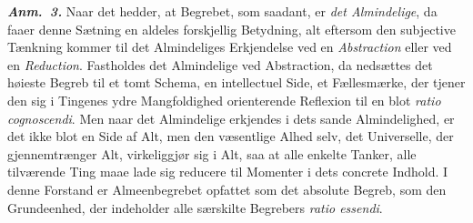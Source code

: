 \documentclass[12pt]{book}
\newcommand{\anm}[1]{\emph{\textbf{Anm.~#1.}}}
\begin{document}
\anm{3} Naar det hedder, at Begrebet, som saadant, er \emph{det Almindelige}, da
faaer denne Sætning en aldeles forskjellig Betydning, alt eftersom den subjective
Tænkning kommer til det Almindeliges Erkjendelse ved en \emph{Abstraction} eller
ved en \emph{Reduction}. Fastholdes det Almindelige ved Abstraction, da nedsættes
det høieste Begreb til et tomt Schema, en intellectuel Side, et Fællesmærke, der
tjener den sig i Tingenes ydre Mangfoldighed orienterende Reflexion til en blot
\textit{ratio cognoscendi}. Men naar det Almindelige erkjendes i dets sande
Almindelighed, er det ikke blot en Side af Alt, men den væsentlige Alhed selv,
det Universelle, der gjennemtrænger Alt, virkeliggjør sig i Alt, saa at alle
enkelte Tanker, alle tilværende Ting maae lade sig reducere til Momenter i dets
concrete Indhold. I denne Forstand er Almeenbegrebet opfattet som det absolute
Begreb, som den Grundeenhed, der indeholder alle særskilte Begrebers
\textit{ratio essendi}.
\end{document}
